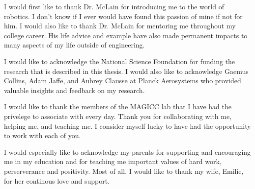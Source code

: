 \afterpage{\cleardoublepage}
%
I would first like to thank Dr. McLain for introducing me to the world of robotics. I
don't know if I ever would have found this passion of mine if not for him. I would also
like to thank Dr. McLain for mentoring me throughout my college career. His life
advice and example have also made permanent impacts to many
aspects of my life outside of engineering.

I would like to acknowledge the National Science Foundation for funding
the research that is described in this thesis. I would also like to acknowledge
Gaemus Collins, Adam Jaffe, and Aubrey Clausse at Planck Aerosystems who provided valuable insights and feedback
on my research.

I would like to thank the members of the MAGICC lab that I
have had the privelege to associate with every day. Thank you for collaborating
with me, helping me, and teaching me. I consider myself lucky to have had the
opportunity to work with each of you.

I would especially like to acknowledge my parents for supporting and
encouraging me in my education and for teaching me important values of hard
work, perserverance and positivity. Most of all, I would like to thank my wife, Emilie, for
her continous love and support.

